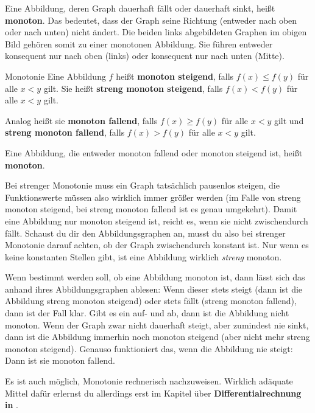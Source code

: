 \documentclass[../../main.tex]{subfiles}
\begin{document}
Eine Abbildung, deren Graph dauerhaft fällt oder dauerhaft sinkt, heißt \textbf{monoton}. Das bedeutet, dass der Graph seine Richtung (entweder nach oben oder nach unten) nicht ändert. Die beiden links abgebildeten Graphen im obigen Bild gehören somit zu einer monotonen Abbildung. Sie führen entweder konsequent nur nach oben (links) oder konsequent nur nach unten (Mitte).

\begin{definition}{Monotonie}
    Eine Abbildung $f$ heißt \textbf{monoton steigend}, falls $f(x)\leq f(y)$ für alle $x<y$ gilt. Sie heißt \textbf{streng monoton steigend}, falls $f(x)<f(y)$ für alle $x<y$ gilt.
    
    Analog heißt sie \textbf{monoton fallend}, falls $f(x)\geq f(y)$ für alle $x<y$ gilt und \textbf{streng monoton fallend}, falls $f(x)>f(y)$ für alle $x<y$ gilt.
    
    Eine Abbildung, die entweder monoton fallend oder monoton steigend ist, heißt \textbf{monoton}.
\end{definition}

Bei strenger Monotonie muss ein Graph tatsächlich pausenlos steigen, die Funktionswerte müssen also wirklich immer größer werden (im Falle von streng monoton steigend, bei streng monoton fallend ist es genau umgekehrt). Damit eine Abbildung nur monoton steigend ist, reicht es, wenn sie nicht zwischendurch fällt. Schaust du dir den Abbildungsgraphen an, musst du also bei strenger Monotonie darauf achten, ob der Graph zwischendurch konstant ist. Nur wenn es keine konstanten Stellen gibt, ist eine Abbildung wirklich \emph{streng} monoton.

Wenn bestimmt werden soll, ob eine Abbildung monoton ist, dann lässt sich das anhand ihres Abbildungsgraphen ablesen: Wenn dieser stets steigt (dann ist die Abbildung streng monoton steigend) oder stets fällt (streng monoton fallend), dann ist der Fall klar. Gibt es ein auf- und ab, dann ist die Abbildung nicht monoton. Wenn der Graph zwar nicht dauerhaft steigt, aber zumindest nie sinkt, dann ist die Abbildung immerhin noch monoton steigend (aber nicht mehr streng monoton steigend). Genauso funktioniert das, wenn die Abbildung nie steigt: Dann ist sie monoton fallend. 

Es ist auch möglich, Monotonie rechnerisch nachzuweisen. Wirklich adäquate Mittel dafür erlernst du allerdings erst im Kapitel über \textbf{Differentialrechnung in \Real}.
\end{document}
